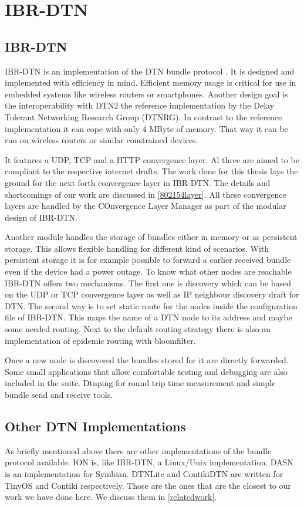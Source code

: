 \chapter{IBR-DTN}
\label{ibr-dtn}
\section{IBR-DTN}

IBR-DTN is an implementation of the DTN bundle protocol \cite{RFC5050}. It is
designed and implemented with efficiency in mind. Efficient memory usage is critical
for use in embedded systems like wireless routers or smartphones. Another design
goal is the interoperability with DTN2 the reference implementation by the Delay
Tolerant Networking Research Group (DTNRG). In contrast to the reference
implementation it can cope with only 4 MByte of memory. That way it can be run
on wireless routers or similar constrained devices.

It features a UDP, TCP and a HTTP convergence layer. Al three are aimed to be
compliant to the respective internet drafts. The work done for this thesis lays
the ground for the next forth convergence layer in IBR-DTN. The details and
shortcomings of our work are discussed in \ref{802154layer}. All these
convergence layers are handled by the COnvergence Layer Manager as part of the
modular design of IBR-DTN.

Another module handles the storage of bundles either in memory or as persistent
storage. This allows flexible handling for different kind of scenarios. With
persistent storage it is for example possible to forward a earlier received bundle
even if the device had a power outage. To know what other nodes are reachable
IBR-DTN offers two mechanisms. The first one is discovery which can be based on
the UDP or TCP convergence layer as well as IP neighbour discovery draft for
DTN. The second way is to set static route for the nodes inside the
configuration file of IBR-DTN. This maps the name of a DTN node to its address
and maybe some needed routing. Next to the default routing strategy there is
also an implementation of epidemic routing with bloomfilter.

Once a new node is discovered the bundles stored for it are directly forwarded.
Some small applications that allow comfortable testing and debugging are also
included in the suite. Dtnping for round trip time measurement and simple bundle
send and receive tools.

\section{Other DTN Implementations}

As briefly mentioned above there are other implementations of the bundle
protocol available. ION is, like IBR-DTN, a Linux/Unix implementation. DASN is
an implementation for Symbian. DTNLite and ContikiDTN are written for TinyOS and
Contiki respectively. Those are the ones that are the closest to our work we
have done here. We discuss them in \ref{relatedwork}.
